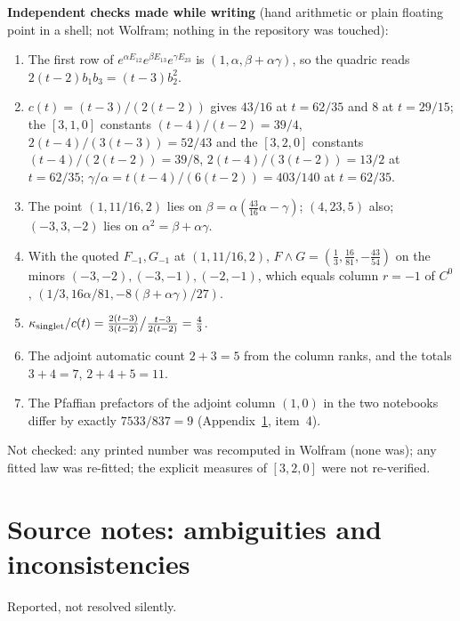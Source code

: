 \documentclass[10pt]{article}
\begin{document}
\textbf{Independent checks made while writing} (hand arithmetic or plain floating point in a shell; not Wolfram; nothing in the repository was touched):
\begin{enumerate}\setlength{\itemsep}{1pt}
\item The first row of $e^{\alpha E_{12}}e^{\beta E_{13}}e^{\gamma E_{23}}$ is $(1,\alpha,\beta+\alpha\gamma)$, so the quadric reads $2(t-2)b_1b_3=(t-3)b_2^2$.
\item $c(t)=(t-3)/(2(t-2))$ gives $43/16$ at $t=62/35$ and $8$ at $t=29/15$; the $[3,1,0]$ constants $(t-4)/(t-2)=39/4$, $2(t-4)/(3(t-3))=52/43$ and the $[3,2,0]$ constants $(t-4)/(2(t-2))=39/8$, $2(t-4)/(3(t-2))=13/2$ at $t=62/35$; $\gamma/\alpha=t(t-4)/(6(t-2))=403/140$ at $t=62/35$.
\item The point $(1,11/16,2)$ lies on $\beta=\alpha(\tfrac{43}{16}\alpha-\gamma)$; $(4,23,5)$ also; $(-3,3,-2)$ lies on $\alpha^2=\beta+\alpha\gamma$.
\item With the quoted $F_{-1},G_{-1}$ at $(1,11/16,2)$, $F\wedge G=(\tfrac13,\tfrac{16}{81},-\tfrac{43}{54})$ on the minors $(-3,-2),(-3,-1),(-2,-1)$, which equals column $r=-1$ of $C^0$, $(1/3,16\alpha/81,-8(\beta+\alpha\gamma)/27)$.
\item $\kappa_{\rm singlet}/c(t)=\tfrac{2(t-3)}{3(t-2)}\big/\tfrac{t-3}{2(t-2)}=\tfrac43$.
\item The adjoint automatic count $2+3=5$ from the column ranks, and the totals $3+4=7$, $2+4+5=11$.
\item The Pfaffian prefactors of the adjoint column $(1,0)$ in the two notebooks differ by exactly $7533/837=9$ (Appendix~\ref{app:notes}, item~4).
\end{enumerate}

Not checked: any printed number was recomputed in Wolfram (none was); any fitted law was re-fitted; the explicit measures of $[3,2,0]$ were not re-verified.

\section{Source notes: ambiguities and inconsistencies}\label{app:notes}

Reported, not resolved silently.
\end{document}
